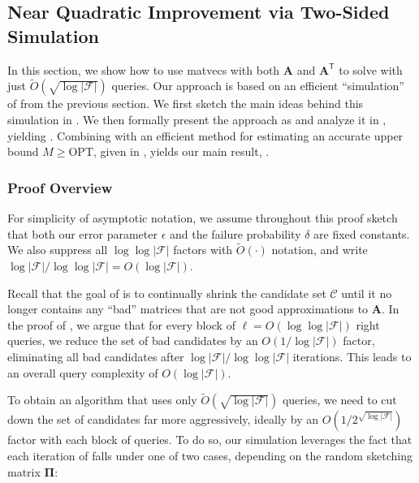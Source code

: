 \documentclass{article}[11pt]
\theoremstyle{definition}
\newcommand{\bv}[1]{\boldsymbol{\mathbf{#1}}}
\newcommand{\T}{\mathsf{T}}
\newcommand{\F}{\mathcal{F}}
\newcommand{\OPT}{\mathrm{OPT}}
\begin{document}
    \subsection{Near Quadratic Improvement via Two-Sided Simulation}
    \label{sec:two_sided}
    In this section, we show how to use matvecs with both $\bv{A}$ and $\bv{A}^\T$ to solve  with just $\tilde{O}(\sqrt{\log|\mathcal{F}|})$ queries. Our approach is based on an efficient ``simulation'' of  from the previous section.
    We first sketch the main ideas behind this simulation in .
    We then formally present the approach as  and analyze it in , yielding . Combining  with an efficient method for estimating an accurate upper bound $M \geq \OPT$, given in ,  yields our main result, .

    \subsubsection{Proof Overview}\label{sec:sketch}
For simplicity of asymptotic notation,  we assume throughout this proof sketch that both our error parameter $\epsilon$ and the failure probability $\delta$ are fixed constants. We also suppress all $\log \log |\F|$ factors with $\tilde O(\cdot)$ notation, and write $\log |\F|/\log\log|\F| = O(\log |\F|)$.

    Recall that the goal of   is to continually shrink the candidate set $\mathcal{C}$ until it no longer contains any ``bad'' matrices that are not good approximations to $\bv{A}$. In the proof of , we argue that for every block of $\ell = {O}(\log\log |\F|)$ right queries, we reduce the set of bad candidates by an $O(1/\log|\F|)$ factor, eliminating all bad candidates after $\log |\F|/\log \log |\F|$ iterations. This leads to an overall query complexity of  ${O}(\log |\F|)$. 
    
    To obtain an algorithm that uses only $\tilde{O}(\sqrt{\log|\mathcal{F}|})$ queries, we need to cut down the set of candidates far more aggressively, ideally by an $O(1/2^{\sqrt{\log|\F|}})$ factor with each block of queries.
    To do so, our simulation 
   leverages the fact that each iteration of  falls under one of two cases, depending on the random sketching matrix $\bv \Pi$:
\end{document}
